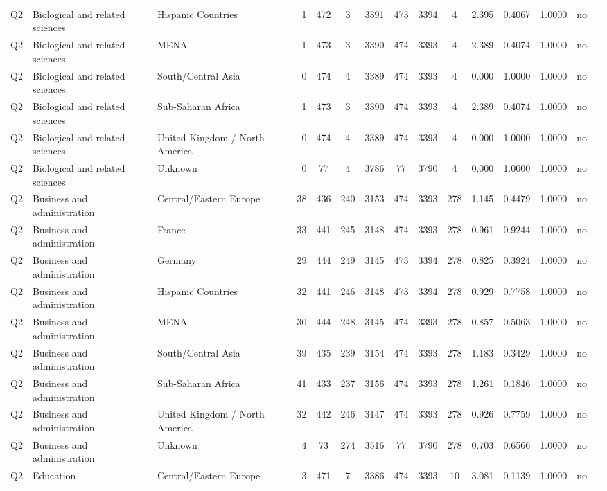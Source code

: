 \begin{longtable}{lllrcccccccccll}
Q2 & Biological and related sciences & Hispanic Countries & 1 & 472 & 3 & 3391 & 473 & 3394 & 4 & 2.395 & 0.4067 & 1.0000 & no \\
Q2 & Biological and related sciences & MENA & 1 & 473 & 3 & 3390 & 474 & 3393 & 4 & 2.389 & 0.4074 & 1.0000 & no \\
Q2 & Biological and related sciences & South/Central Asia & 0 & 474 & 4 & 3389 & 474 & 3393 & 4 & 0.000 & 1.0000 & 1.0000 & no \\
Q2 & Biological and related sciences & Sub-Saharan Africa & 1 & 473 & 3 & 3390 & 474 & 3393 & 4 & 2.389 & 0.4074 & 1.0000 & no \\
Q2 & Biological and related sciences & United Kingdom / North America & 0 & 474 & 4 & 3389 & 474 & 3393 & 4 & 0.000 & 1.0000 & 1.0000 & no \\
Q2 & Biological and related sciences & Unknown & 0 & 77 & 4 & 3786 & 77 & 3790 & 4 & 0.000 & 1.0000 & 1.0000 & no \\
Q2 & Business and administration & Central/Eastern Europe & 38 & 436 & 240 & 3153 & 474 & 3393 & 278 & 1.145 & 0.4479 & 1.0000 & no \\
Q2 & Business and administration & France & 33 & 441 & 245 & 3148 & 474 & 3393 & 278 & 0.961 & 0.9244 & 1.0000 & no \\
Q2 & Business and administration & Germany & 29 & 444 & 249 & 3145 & 473 & 3394 & 278 & 0.825 & 0.3924 & 1.0000 & no \\
Q2 & Business and administration & Hispanic Countries & 32 & 441 & 246 & 3148 & 473 & 3394 & 278 & 0.929 & 0.7758 & 1.0000 & no \\
Q2 & Business and administration & MENA & 30 & 444 & 248 & 3145 & 474 & 3393 & 278 & 0.857 & 0.5063 & 1.0000 & no \\
Q2 & Business and administration & South/Central Asia & 39 & 435 & 239 & 3154 & 474 & 3393 & 278 & 1.183 & 0.3429 & 1.0000 & no \\
Q2 & Business and administration & Sub-Saharan Africa & 41 & 433 & 237 & 3156 & 474 & 3393 & 278 & 1.261 & 0.1846 & 1.0000 & no \\
Q2 & Business and administration & United Kingdom / North America & 32 & 442 & 246 & 3147 & 474 & 3393 & 278 & 0.926 & 0.7759 & 1.0000 & no \\
Q2 & Business and administration & Unknown & 4 & 73 & 274 & 3516 & 77 & 3790 & 278 & 0.703 & 0.6566 & 1.0000 & no \\
Q2 & Education & Central/Eastern Europe & 3 & 471 & 7 & 3386 & 474 & 3393 & 10 & 3.081 & 0.1139 & 1.0000 & no \\

\end{longtable}
